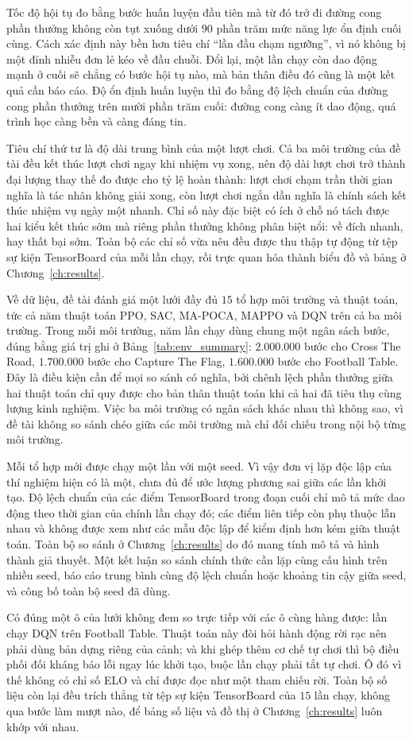 \indent Tốc độ hội tụ đo bằng bước huấn luyện đầu tiên mà từ đó trở đi đường cong phần
thưởng không còn tụt xuống dưới $90$ phần trăm mức năng lực ổn định cuối cùng. Cách
xác định này bền hơn tiêu chí ``lần đầu chạm ngưỡng'', vì nó không bị một đỉnh nhiễu đơn lẻ
kéo về đầu chuỗi. Đổi lại, một lần chạy còn dao động mạnh ở cuối sẽ chẳng có bước hội tụ nào,
mà bản thân điều đó cũng là một kết quả cần báo cáo. Độ ổn định huấn luyện thì đo
bằng độ lệch chuẩn của đường cong phần thưởng trên mười phần trăm cuối: đường cong càng ít
dao động, quá trình học càng bền và càng đáng tin.

\indent Tiêu chí thứ tư là độ dài trung bình của một lượt chơi. Cả ba môi trường của đề
tài đều kết thúc lượt chơi ngay khi nhiệm vụ xong, nên độ dài lượt chơi trở thành đại
lượng thay thế đo được cho tỷ lệ hoàn thành: lượt chơi chạm trần thời gian nghĩa là tác
nhân không giải xong, còn lượt chơi ngắn dần nghĩa là chính sách kết thúc nhiệm vụ ngày
một nhanh. Chỉ số này đặc biệt có ích ở chỗ nó tách được hai kiểu kết thúc sớm mà riêng
phần thưởng không phân biệt nổi: về đích nhanh, hay thất bại sớm. Toàn bộ các chỉ số vừa
nêu đều được thu thập tự động từ tệp sự kiện TensorBoard của mỗi lần chạy, rồi trực quan
hóa thành biểu đồ và bảng ở Chương~\ref{ch:results}.

\indent Về dữ liệu, đề tài đánh giá một lưới đầy đủ $15$ tổ hợp môi trường và thuật toán, tức
cả năm thuật toán PPO, SAC, MA-POCA, MAPPO và DQN trên cả ba môi trường. Trong
mỗi môi trường, năm lần chạy dùng chung một ngân sách bước, đúng bằng giá trị ghi ở
Bảng~\ref{tab:env_summary}: $2.000.000$ bước cho Cross The Road, $1.700.000$ bước cho Capture The
Flag, $1.600.000$ bước cho Football Table. Đây là điều
kiện cần để mọi so sánh có nghĩa, bởi chênh lệch phần thưởng giữa hai thuật toán chỉ quy
được cho bản thân thuật toán khi cả hai đã tiêu thụ cùng lượng kinh nghiệm. Việc ba môi
trường có ngân sách khác nhau thì không sao, vì đề tài không so sánh chéo giữa các môi
trường mà chỉ đối chiếu trong nội bộ từng môi trường.

\indent Mỗi tổ hợp mới được chạy một lần với một seed. Vì vậy đơn vị lặp độc lập của thí
nghiệm hiện có là một, chưa đủ để ước lượng phương sai giữa các lần khởi tạo. Độ lệch chuẩn
của các điểm TensorBoard trong đoạn cuối chỉ mô tả mức dao động theo thời gian của chính
lần chạy đó; các điểm liên tiếp còn phụ thuộc lẫn nhau và không được xem như các mẫu độc
lập để kiểm định hơn kém giữa thuật toán. Toàn bộ so sánh ở Chương~\ref{ch:results} do đó
mang tính mô tả và hình thành giả thuyết. Một kết luận so sánh chính thức cần lặp cùng cấu
hình trên nhiều seed, báo cáo trung bình cùng độ lệch chuẩn hoặc khoảng tin cậy giữa seed,
và công bố toàn bộ seed đã dùng.

\indent Có đúng một ô của lưới không đem so trực tiếp với các ô cùng hàng được: lần chạy
DQN trên Football Table. Thuật toán này đòi hỏi hành động rời rạc nên phải dùng bản dựng
riêng của cảnh; và khi ghép thêm cơ chế tự chơi thì bộ điều phối đối kháng báo lỗi ngay
lúc khởi tạo, buộc lần chạy phải tắt tự chơi. Ô đó vì thế không có chỉ số ELO và chỉ được
đọc như một tham chiếu rời. Toàn bộ số liệu còn lại đều trích thẳng từ tệp sự kiện
TensorBoard của $15$ lần chạy, không qua bước làm mượt nào, để bảng số liệu và đồ thị
ở Chương~\ref{ch:results} luôn khớp với nhau.
